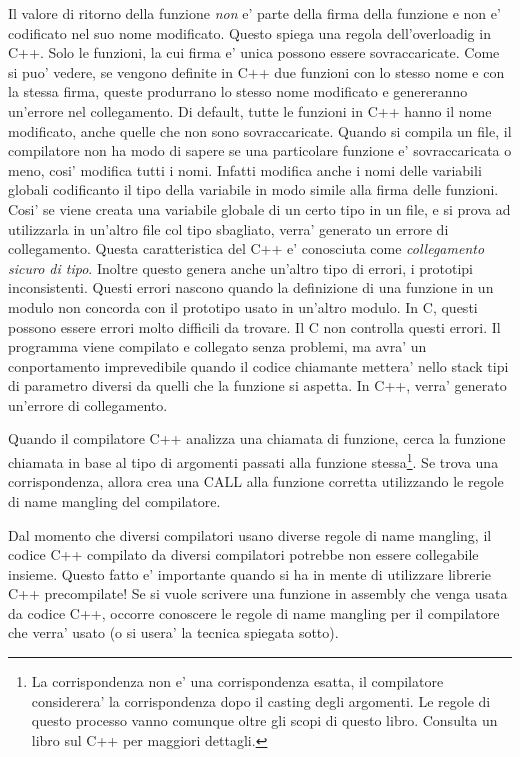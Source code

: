 Il valore di ritorno della funzione \emph{non} e' parte della firma
della funzione e non e' codificato nel suo nome modificato. Questo spiega
una regola dell'overloadig in C++. Solo le funzioni, la cui firma e'
unica possono essere sovraccaricate. Come si puo' vedere, se vengono
definite in C++ due funzioni con lo stesso nome e con la stessa firma,
queste produrrano lo stesso nome modificato e genereranno un'errore
nel collegamento. Di default, tutte le funzioni in C++ hanno il nome 
modificato, anche quelle che non sono sovraccaricate. Quando si compila
un file, il compilatore non ha modo di sapere se una particolare
funzione e' sovraccaricata o meno, cosi' modifica tutti i nomi. Infatti
modifica anche i nomi delle variabili globali codificanto il tipo della
variabile in modo simile alla firma delle funzioni. Cosi' se viene
creata una variabile globale di un certo tipo in un file, e si prova
ad utilizzarla in un'altro file col tipo sbagliato, verra' generato
un errore di collegamento. Questa caratteristica del C++ e' conosciuta
come \emph{collegamento sicuro di tipo}.  
Inoltre questo genera anche un'altro tipo di errori, i prototipi 
inconsistenti. Questi errori nascono quando la definizione di una 
funzione in un modulo non concorda con il prototipo usato in un'altro
modulo. In C, questi possono essere errori molto difficili da trovare.
Il C non controlla questi errori. Il programma viene compilato e 
collegato senza problemi, ma avra' un conportamento imprevedibile
quando il codice chiamante mettera' nello stack tipi di parametro
diversi da quelli che la funzione si aspetta. In C++, verra'
generato un'errore di collegamento.

Quando il compilatore C++ analizza una chiamata di funzione, cerca la
funzione chiamata in base al tipo di argomenti passati alla funzione
stessa\footnote{La corrispondenza non e' una corrispondenza esatta, 
il compilatore considerera' la corrispondenza dopo il casting degli
argomenti. Le regole di questo processo vanno comunque oltre gli scopi
di questo libro. Consulta un libro sul C++ per maggiori dettagli.}.
Se trova una corrispondenza, allora crea una {\code CALL} alla funzione
corretta utilizzando le regole di name mangling del compilatore.

Dal momento che diversi compilatori usano diverse regole di name mangling,
il codice C++ compilato da diversi compilatori potrebbe non essere
collegabile insieme. Questo fatto e' importante quando si ha in mente
di utilizzare librerie C++ precompilate! Se si vuole scrivere una
funzione in assembly che venga usata da codice C++, occorre conoscere
le regole di name mangling per il compilatore che verra' usato (o si
usera' la tecnica spiegata sotto).

